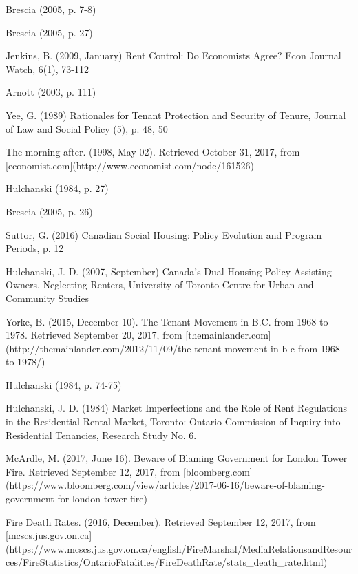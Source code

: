 \begin{thebibliography}{9}
  Brescia (2005, p. 7-8)

   Brescia (2005, p. 27)

  Jenkins, B. (2009, January) Rent Control: Do Economists Agree? Econ Journal Watch, 6(1), 73-112

  Arnott (2003, p. 111)

  Yee, G. (1989) Rationales for Tenant Protection and Security of Tenure, Journal of Law and Social Policy (5), p. 48, 50

   The morning after. (1998, May 02). Retrieved October 31, 2017, from [economist.com](http://www.economist.com/node/161526)

  Hulchanski (1984, p. 27)

  Brescia (2005, p. 26)

  Suttor, G. (2016) Canadian Social Housing: Policy Evolution and Program Periods, p. 12

  Hulchanski, J. D. (2007, September) Canada’s Dual Housing Policy Assisting Owners, Neglecting Renters, University of Toronto Centre for Urban and Community Studies

  Yorke, B. (2015, December 10). The Tenant Movement in B.C. from 1968 to 1978. Retrieved September 20, 2017, from [themainlander.com](http://themainlander.com/2012/11/09/the-tenant-movement-in-b-c-from-1968-to-1978/)

   Hulchanski (1984, p. 74-75)

    Hulchanski, J. D. (1984) Market Imperfections and the Role of Rent Regulations in the Residential Rental Market, Toronto: Ontario Commission of Inquiry into Residential Tenancies, Research Study No. 6.

  McArdle, M. (2017, June 16). Beware of Blaming Government for London Tower Fire. Retrieved September 12, 2017, from [bloomberg.com](https://www.bloomberg.com/view/articles/2017-06-16/beware-of-blaming-government-for-london-tower-fire)

  Fire Death Rates. (2016, December). Retrieved September 12, 2017, from [mcscs.jus.gov.on.ca](https://www.mcscs.jus.gov.on.ca/english/FireMarshal/MediaRelationsandResources/FireStatistics/OntarioFatalities/FireDeathRate/stats\_death\_rate.html)


\end{thebibliography}
